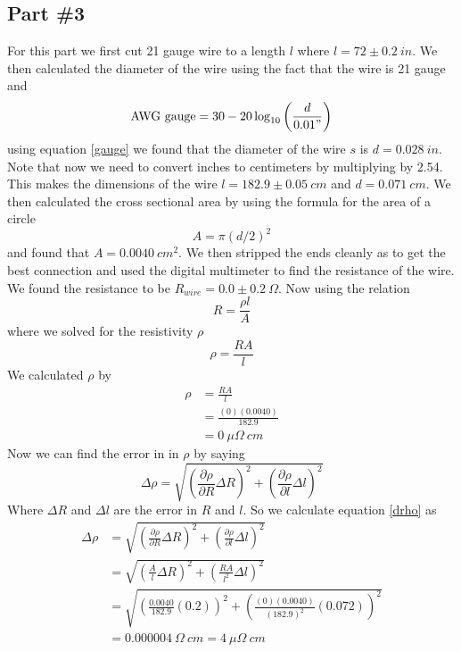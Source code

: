 \documentclass[11pt]{article}
\numberwithin{equation}{section}
\begin{document}
\subsection{Part \#3}
For this part we first cut 21 gauge wire to a length $l$ where $l = 72\pm0.2\ in$. We then calculated the diameter of the wire using the fact that the wire is 21 gauge and 
\begin{equation}
\textnormal{AWG gauge} = 30 - 20\log_{10}\left(\frac{d}{0.01"}\right)
\label{gauge}
\end{equation}
using equation \ref{gauge} we found that the diameter of the wire $s$ is $d = 0.028\ in$. Note that now we need to convert inches to centimeters by multiplying by 2.54. This makes the dimensions of the wire $l = 182.9\pm0.05\ cm$ and $d = 0.071\ cm$. We then calculated the cross sectional area by using the formula for the area of a circle
$$A = \pi (d/2)^2$$
and found that $A = 0.0040\ cm^2$. We then stripped the ends cleanly as to get the best connection and used the digital multimeter to find the resistance of the wire. We found the resistance to be $R_{wire} = 0.0\pm0.2\ \Omega$. Now using the relation
$$R = \frac{\rho l}{A}$$
where we solved for the resistivity $\rho$
\begin{equation}
\rho = \frac{R A}{l}
\label{resistanc}
\end{equation}
We calculated $\rho$ by
\begin{align*}
\rho &= \frac{R A}{l}\\
&= \frac{(0)(0.0040)}{182.9}\\
&= 0\ \mu\Omega\ cm
\end{align*}
Now we can find the error in in $\rho$ by saying
\begin{equation}
\Delta\rho = \sqrt{\left(\frac{\partial \rho}{\partial R}\Delta R\right)^2 + \left(\frac{\partial \rho}{\partial l}\Delta l\right)^2}
\label{drho}
\end{equation}
Where $\Delta R$ and $\Delta l$ are the error in $R$ and $l$. So we calculate equation \ref{drho} as
\begin{align*}
\Delta\rho &= \sqrt{\left(\frac{\partial \rho}{\partial R}\Delta R\right)^2 + \left(\frac{\partial \rho}{\partial l}\Delta l\right)^2}\\
&= \sqrt{\left(\frac{A}{l}\Delta R\right)^2 + \left(\frac{R A}{l^2}\Delta l\right)^2}\\
&= \sqrt{\left(\frac{0.0040}{182.9}(0.2)\right)^2 + \left(\frac{(0)(0.0040)}{(182.9)^2}(0.072)\right)^2}\\
&= 0.000004\ \Omega\ cm = 4\ \mu\Omega\ cm
\end{align*}
\end{document}
